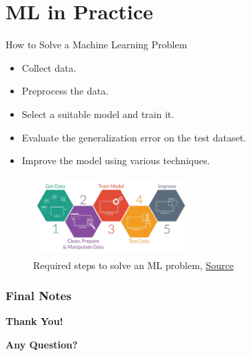 \documentclass[compress,oilve]{beamer}
\begin{document}
\section{ML in Practice}
\begin{frame}{How to Solve a Machine Learning Problem}
	\begin{itemize}
		\item Collect data.
		\item Preprocess the data.
		\item Select a suitable model and train it.
		\item Evaluate the generalization error on the test dataset.
		\item Improve the model using various techniques.
	\end{itemize}

	\begin{figure}
	 \centering
	 \includegraphics[width=6cm, height=3cm]{Figs/7.jpeg}  
	 \caption{Required steps to solve an ML problem, \href{https://tinyurl.com/2m7epjl2}{Source}}
	\end{figure}

\end{frame}


\frametitle{Final Notes}
\centering
\vspace{50 pt}
\textbf{Thank You!}
\vspace{50pt}

\textbf{Any Question?}
\end{document}

